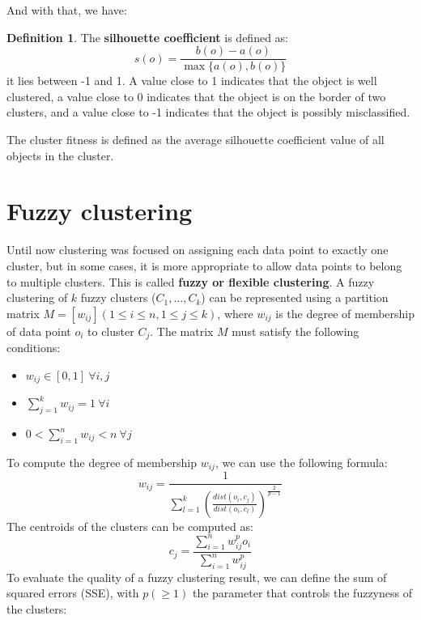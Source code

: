 \documentclass[12pt, openany]{report}
\theoremstyle{definition}
\newtheorem{definition}[thm]{Definition}
\begin{document}
And with that, we have:
\begin{definition}
    The \textbf{silhouette coefficient} is defined as:
    \begin{equation}        
        s(o) = \frac{b(o) - a(o)}{\max\{a(o), b(o)\}}
    \end{equation}
    it lies between -1 and 1. A value close to 1 indicates that the object is well clustered, a value close to 0 indicates that the object is on the border of two clusters, and a value close to -1 indicates that the object is possibly misclassified.
\end{definition}
The cluster fitness is defined as the average silhouette coefficient value of all objects in the cluster.
\section{Fuzzy clustering}
Until now clustering was focused on assigning each data point to exactly one cluster, but in some cases, it is more appropriate to allow data points to belong to multiple clusters. This is called \textbf{fuzzy or flexible clustering}.
A fuzzy clustering of $k$ fuzzy clusters ($C_1, \ldots, C_k$) can be represented using a partition matrix $M = [w_{ij}] (1 \leq i \leq n, 1 \leq j \leq k)$, where $w_{ij}$ is the degree of membership of data point $o_i$ to cluster $C_j$.  
The matrix $M$ must satisfy the following conditions:
\begin{itemize}
    \item $w_{ij} \in [0, 1] \: \forall i,j$
    \item $\sum_{j=1}^{k} w_{ij} = 1 \: \forall i$
    \item $0 < \sum_{i=1}^{n} w_{ij} < n \: \forall j$
\end{itemize}
To compute the degree of membership $w_{ij}$, we can use the following formula:
\begin{equation}
    w_{ij} = \frac{1}{\sum_{l=1}^{k} \left(\frac{dist(o_i, c_j)}{dist(o_i, c_l)}\right)^{\frac{2}{p-1}}}
\end{equation}
The centroids of the clusters can be computed as:
\begin{equation}
    c_j = \frac{\sum_{i=1}^{n} w_{ij}^p o_i}{\sum_{i=1}^{n} w_{ij}^p}
\end{equation}
To evaluate the quality of a fuzzy clustering result, we can define the sum of squared errors (SSE), with $p (\geq 1)$ the parameter that controls the fuzzyness of the clusters:
\end{document}
